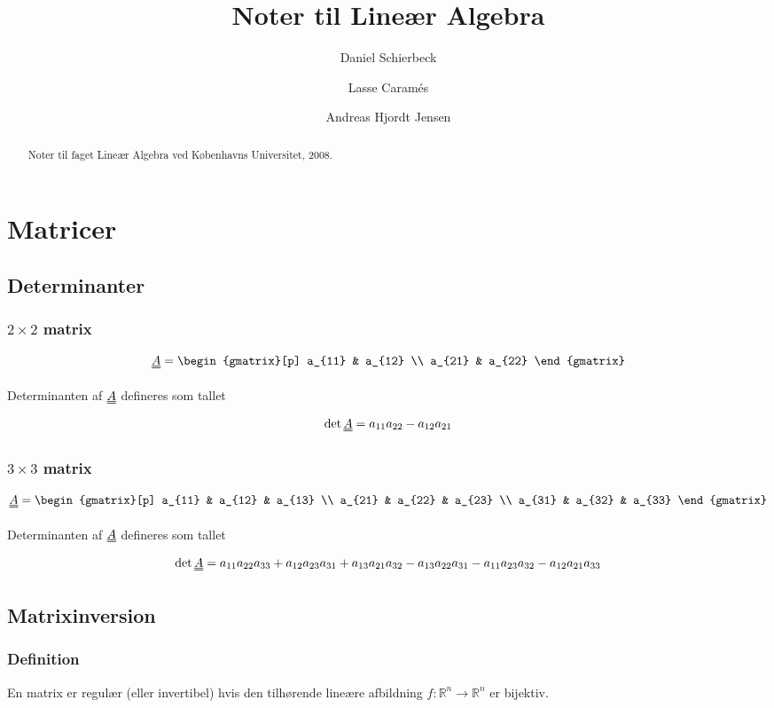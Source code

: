 \documentclass[a4paper]{article}
\title{Noter til Lineær Algebra}
\author{Daniel Schierbeck \and Lasse Caramés \and Andreas Hjordt Jensen}
\newcommand{\mtx}[1]{\uuline{#1}}
\newcommand{\set}[1]{\mathbb{#1}}
\begin{document}
\maketitle

\begin{abstract}
Noter til faget Lineær Algebra ved Københavns Universitet, 2008.
\end{abstract}

\tableofcontents

\section{Matricer}

\subsection{Determinanter}

\subsubsection{$2 \times 2$ matrix}
$$
\mtx{A} =
\begin{gmatrix}[p]
    a_{11} & a_{12} \\
    a_{21} & a_{22}
\end{gmatrix}
$$

Determinanten af $\mtx{A}$ defineres som tallet
$$
\det{\mtx{A}} = a_{11}a_{22} - a_{12}a_{21}
$$


\subsubsection{$3 \times 3$ matrix}
$$
\mtx{A} =
\begin{gmatrix}[p]
    a_{11} & a_{12} & a_{13} \\
    a_{21} & a_{22} & a_{23} \\
    a_{31} & a_{32} & a_{33}
\end{gmatrix}
$$

Determinanten af $\mtx{A}$ defineres som tallet
$$
\det{\mtx{A}} = a_{11}a_{22}a_{33} + a_{12}a_{23}a_{31} + a_{13}a_{21}a_{32} - a_{13}a_{22}a_{31} - a_{11}a_{23}a_{32} - a_{12}a_{21}a_{33}
$$


\subsection{Matrixinversion}
\subsubsection{Definition}
En matrix er regulær (eller invertibel) hvis den tilhørende lineære afbildning $f : \set{R}^n \rightarrow \set{R}^n$ er bijektiv.
\end{document}
